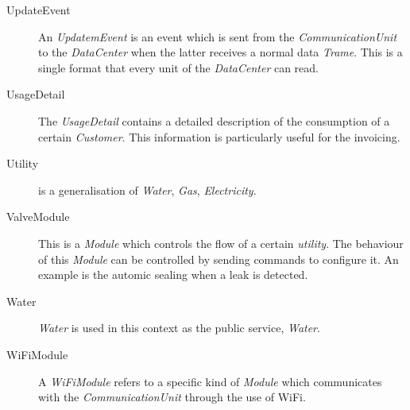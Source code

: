 \begin{description}
\item[UpdateEvent] An \emph{UpdatemEvent} is an event which is sent from the
\emph{CommunicationUnit} to the \emph{DataCenter} when the latter receives a
normal data \emph{Trame}. This is a single format that every unit of the
\emph{DataCenter} can read.

\item[UsageDetail] The \emph{UsageDetail} contains a detailed description of the
consumption of a certain \emph{Customer}. This information is particularly
useful for the invoicing.

\item[Utility] is a generalisation of \emph{Water}, \emph{Gas},
\emph{Electricity}.

\item[ValveModule] This is a \emph{Module} which controls the flow of a certain
\emph{utility}. The behaviour of this \emph{Module} can be controlled by sending
commands to configure it. An example is the automic sealing when a leak is
detected.

\item[Water] \emph{Water} is used in this context as the public service,
\emph{Water}.

\item[WiFiModule] A \emph{WiFiModule} refers to a specific kind of \emph{Module}
which communicates with the \emph{CommunicationUnit} through the use of WiFi.

\end{description}
